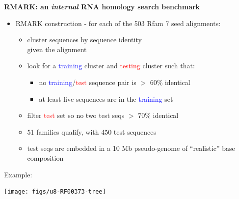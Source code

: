 \documentclass[landscape]{slides}
\begin{document}
\begin{slide}
\begin{center}
\textbf{RMARK: an \emph{internal}  RNA homology search benchmark}
\end{center}
\medskip
\begin{minipage}{7in}
\small
\begin{itemize}
\item
  RMARK construction - for each of the 503 Rfam 7 seed alignments:
  \begin{itemize}
  \item 
    cluster sequences by sequence identity \\ given the alignment
  \item 
    look for a \textcolor{blue}{training} cluster and
    \textcolor{red}{testing} cluster such that: 
    \begin{itemize}
    \item
      no \textcolor{blue}{training}/\textcolor{red}{test} sequence pair is $>$ 60\% identical
    \item
      at least five sequences are in the \textcolor{blue}{training} set
    \end{itemize}
  \item
    filter \textcolor{red}{test} set so no two test seqs $>$ 70\% identical 
  \item
    51 families qualify, with 450 test sequences
  \item
    test seqs are embedded in a 10 Mb pseudo-genome of ``realistic'' base composition
  \end{itemize}
\end{itemize}
\vspace{1.5in}
\end{minipage}
\hspace{0.1in}
\begin{minipage}{3.5in}
  Example: 
\vspace{0.2in}

\begin{center}
\texttt{[image: figs/u8-RF00373-tree]}

\end{center}
\end{minipage}
\end{slide}
\end{document}
